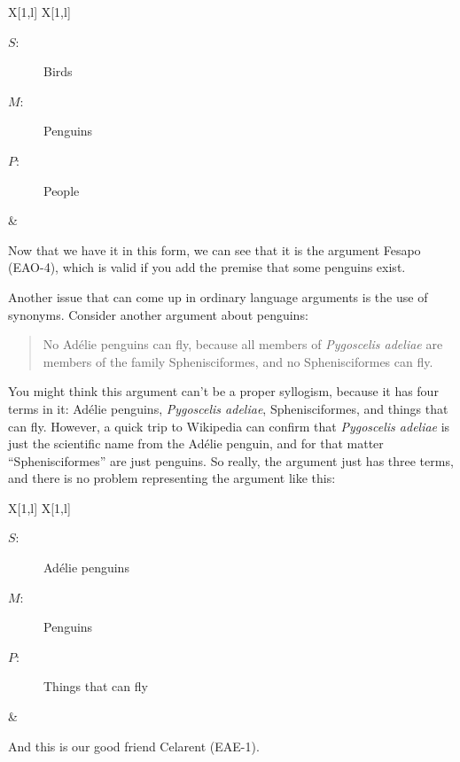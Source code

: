 \begin{tabu}{{X[1,l] X[1,l]}}
\begin{description}
\item[$S$:] Birds
\item[$M$:] Penguins
\item[$P$:] People
\end{description}
&
\begin{kormanize}
\end{kormanize}
\end{tabu}

Now that we have it in this form, we can see that it is the argument Fesapo (EAO-4), which is valid if you add the premise that some penguins exist.

Another issue that can come up in ordinary language arguments is the use of synonyms. Consider another argument about penguins:

\begin{quotation}
\noindent No Ad\'{e}lie penguins can fly, because all members of \emph{Pygoscelis adeliae} are members of the family Sphenisciformes, and no Sphenisciformes can fly.
\end{quotation}

You might think this argument can't be a proper syllogism, because it has four terms in it: Ad\'{e}lie penguins, \emph{Pygoscelis adeliae}, Sphenisciformes, and things that can fly. However, a quick trip to Wikipedia can confirm that \emph{Pygoscelis adeliae} is just the scientific name from the Ad\'{e}lie penguin, and for that matter ``Sphenisciformes'' are just penguins. So really, the argument just has three terms, and there is no problem representing the argument  like this:

\begin{tabu}{{X[1,l] X[1,l]}}
\begin{description}
\item[$S$:] Ad\'{e}lie penguins
\item[$M$:] Penguins
\item[$P$:] Things that can fly
\end{description}
&
\begin{kormanize}
\end{kormanize}
\end{tabu}

And this is our good friend Celarent (EAE-1).

